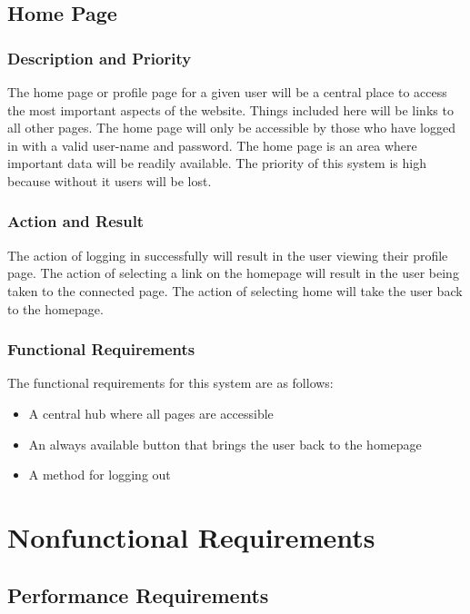 \documentclass[letterpaper,10pt,titlepage,journal,compsoc,draftclsnofoot,onecolumn]{IEEEtran}
\begin{document}
\subsection{Home Page}

\subsubsection{Description and Priority}

The home page or profile page for a given user will be a central place to access the most important aspects of the website. Things included here will be links to all other pages. The home page will only be accessible by those who have logged in with a valid user-name and password. The home page is an area where important data will be readily available. The priority of this system is high because without it users will be lost.

\subsubsection{Action and Result}

The action of logging in successfully will result in the user viewing their profile page. The action of selecting a link on the homepage will result in the user being taken to the connected page. The action of selecting home will take the user back to the homepage. 

\subsubsection{Functional Requirements}

The functional requirements for this system are as follows:
\begin{itemize}
\item A central hub where all pages are accessible
\item An always available button that brings the user back to the homepage
\item A method for logging out
\end{itemize}

\section{Nonfunctional Requirements}

\subsection{Performance Requirements}
\end{document}
